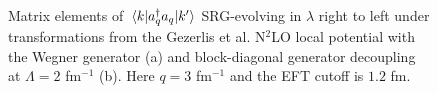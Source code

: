 \documentclass[preprintnumbers,floatfix,aps,prc,preprint,nofootinbib]{revtex4-1}
\begin{document}
\begin{figure}[H]
	\centering
	
	\caption{Matrix elements of $\mel{k}{a^{\dagger}_q a_q}{k'}$ SRG-evolving in $\lambda$ right to left under transformations from the Gezerlis et al. N$^2$LO local potential with the Wegner generator (a) and block-diagonal generator decoupling at $\Lambda=2$ fm$^{-1}$ (b). Here $q=3$ fm$^{-1}$ and the EFT cutoff is $1.2$ fm.}
	\label{momentum_projection_contours_q3,00_kvnn224}
\end{figure}





\end{document}

